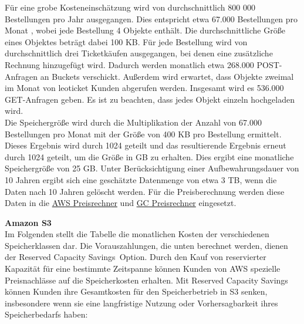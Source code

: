 Für eine grobe Kosteneinschätzung wird von durchschnittlich 800 000 Bestellungen pro Jahr ausgegangen. Dies entspricht etwa 67.000 Bestellungen pro Monat , wobei jede Bestellung 4 Objekte enthält. Die durchschnittliche Größe eines Objektes beträgt dabei 100 KB. Für jede  Bestellung wird von durchschnittlich drei Ticketkäufen ausgegangen, bei denen eine zusätzliche Rechnung hinzugefügt wird. Dadurch werden monatlich etwa 268.000 POST-Anfragen an Buckets verschickt. Außerdem wird erwartet, dass Objekte zweimal im Monat von leoticket Kunden abgerufen werden. Insgesamt wird es 536.000 GET-Anfragen geben. Es ist zu beachten, dass jedes Objekt einzeln hochgeladen wird.\\

Die Speichergröße wird durch die Multiplikation der Anzahl von 67.000 Bestellungen pro Monat mit der Größe von 400 KB pro Bestellung ermittelt. Dieses Ergebnis wird durch 1024 geteilt und das resultierende Ergebnis erneut durch 1024 geteilt, um die Größe in GB zu erhalten. Dies ergibt eine monatliche Speichergröße von 25 GB. Unter Berücksichtigung einer Aufbewahrungsdauer von 10 Jahren ergibt sich eine geschätzte Datenmenge von etwa 3 TB, wenn die Daten nach 10 Jahren gelöscht werden. Für die Preisberechnung werden diese Daten in die \href{https://calculator.aws/#/addService?nc2=h_ql_pr_calc}{AWS Preisrechner} und \href{https://cloud.google.com/products/calculator}{GC Preisrechner} eingesetzt.\\

\newpage

\textbf{Amazon S3}\\

Im Folgenden stellt die Tabelle die monatlichen Kosten der verschiedenen Speicherklassen dar. Die Vorauszahlungen, die unten berechnet werden, dienen der \glqq Reserved Capacity Savings\grqq\ Option. Durch den Kauf von reservierter Kapazität für eine bestimmte Zeitspanne können Kunden von AWS spezielle Preisnachlässe auf die Speicherkosten erhalten. Mit Reserved Capacity Savings können Kunden ihre Gesamtkosten für den Speicherbetrieb in S3 senken, insbesondere wenn sie eine langfristige Nutzung oder Vorhersagbarkeit ihres Speicherbedarfs haben:

